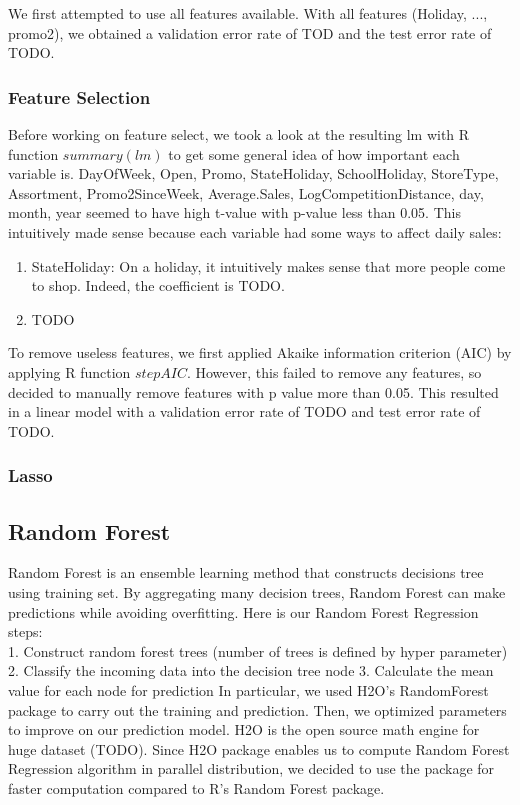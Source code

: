 \documentclass[letterpaper,twocolumn,10pt]{article}
\begin{document}
We first attempted to use all features available. With all features (Holiday, ..., promo2), we obtained a validation error rate of TOD and the test error rate of TODO.

\subsubsection{Feature Selection}
Before working on feature select, we took a look at the resulting lm with R function $summary(lm)$ to get some general idea of how important each variable is. DayOfWeek, Open, Promo, StateHoliday, SchoolHoliday, StoreType, Assortment, Promo2SinceWeek, Average.Sales, LogCompetitionDistance, day, month, year seemed to have high t-value with p-value less than 0.05. This intuitively made sense because each variable had some ways to affect daily sales:
\begin{enumerate}
\item StateHoliday: On a holiday, it intuitively makes sense that more people come to shop. Indeed, the coefficient is TODO.
\item TODO
\end{enumerate}

To remove useless features, we first applied Akaike information criterion (AIC) by applying R function $stepAIC$. However, this failed to remove any features, so decided to manually remove features with p value more than 0.05. This resulted in a linear model with a validation error rate of TODO and test error rate of TODO.

\subsubsection{Lasso}


\subsection{Random Forest}
Random Forest is an ensemble learning method that constructs decisions tree using training set. By aggregating many decision trees, Random Forest can make predictions while avoiding overfitting. Here is our Random Forest Regression steps: \\
1. Construct random forest trees (number of trees is defined by hyper parameter)
2. Classify the incoming data into the decision tree node
3. Calculate the mean value for each node for prediction
In particular, we used H2O’s RandomForest package to carry out the training and prediction. Then, we optimized parameters to improve on our prediction model. H2O is the open source math engine for huge dataset (TODO). Since H2O package enables us to compute Random Forest Regression algorithm in parallel distribution, we decided to use the package for faster computation compared to R's Random Forest package.
\end{document}
